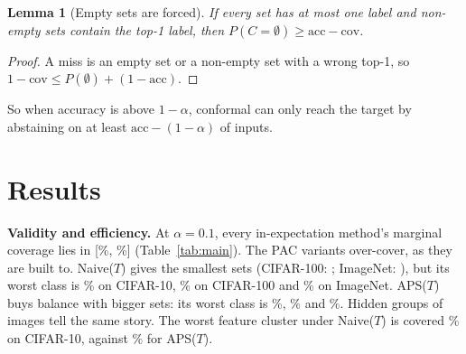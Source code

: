 \documentclass{article}
\newtheorem{lemma}{Lemma}
\newcommand{\dtest}{D_\text{test}}
\newcommand{\cov}{\mathrm{cov}}
\begin{document}
\begin{lemma}[Empty sets are forced]\label{lem:empty}
If every set has at most one label and non-empty sets contain the top-1 label, then $P(C=\emptyset)\ge\mathrm{acc}-\cov$.
\end{lemma}
\begin{proof}
A miss is an empty set or a non-empty set with a wrong top-1, so $1-\cov\le P(\emptyset)+(1-\mathrm{acc})$.
\end{proof}
So when accuracy is above $1-\alpha$, conformal can only reach the target by abstaining on at least $\mathrm{acc}-(1-\alpha)$ of
inputs.

\section{Results}\label{sec:results}
\begin{table}[t]
\centering\small
\caption{$\dtest$ at $\alpha=0.1$, mean over seeds. Worst: worst-class coverage. Full tables (all runs, all methods, std) in Appendix~\ref{app:tables}.}
\label{tab:main}

\end{table}
\textbf{Validity and efficiency.} At $\alpha=0.1$, every in-expectation method's marginal coverage lies in [\CovLo\%, \CovHi\%]
(Table~\ref{tab:main}). The PAC variants over-cover, as they are built to. Naive($T$) gives the smallest sets (CIFAR-100:
\SizeCHunNaiveT; ImageNet: \SizeINetNaiveT), but its worst class is \WorstCTenNaiveT\% on CIFAR-10, \WorstCHunNaiveT\% on CIFAR-100
and \WorstINetNaiveT\% on ImageNet. APS($T$) buys balance with bigger sets: its worst class is \WorstCTenAPST\%, \WorstCHunAPST\% and
\WorstINetAPST\%. Hidden groups of images tell the same story. The worst feature cluster under Naive($T$) is covered \FscCTenNaiveT\%
on CIFAR-10, against \FscCTenAPST\% for APS($T$).
\end{document}
